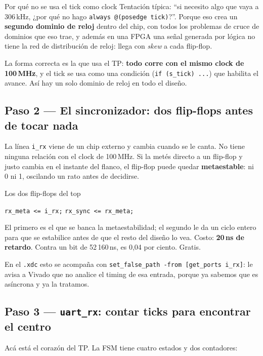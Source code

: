 \documentclass[11pt,a4paper]{article}
\newcommand{\sg}[1]{\texttt{\small #1}}
\begin{document}
\begin{intuicion}{Por qu\'e no se usa el tick como clock}
Tentaci\'on t\'ipica: ``si necesito algo que vaya a 306\,kHz, ¿por qu\'e no hago
\sg{always @(posedge tick)}?''. Porque eso crea un \textbf{segundo dominio de
reloj} dentro del chip, con todos los problemas de cruce de dominios que eso
trae, y adem\'as en una FPGA una se\~nal generada por l\'ogica no tiene la red de
distribuci\'on de reloj: llega con \emph{skew} a cada flip-flop.

La forma correcta es la que usa el TP: \textbf{todo corre con el mismo clock de
100\,MHz}, y el tick se usa como una condici\'on (\sg{if (s\_tick) ...}) que
habilita el avance. As\'i hay un solo dominio de reloj en todo el dise\~no.
\end{intuicion}

\subsection{Paso 2 --- El sincronizador: dos flip-flops antes de tocar nada}

La l\'inea \sg{i\_rx} viene de un chip externo y cambia cuando se le canta. No
tiene ninguna relaci\'on con el clock de 100\,MHz. Si la met\'es directo a un
flip-flop y justo cambia en el instante del flanco, el flip-flop puede quedar
\textbf{metaestable}: ni 0 ni 1, oscilando un rato antes de decidirse.

\begin{ficha}{Los dos flip-flops del top}
\begin{center}
\sg{rx\_meta <= i\_rx;} \qquad \sg{rx\_sync <= rx\_meta;}
\end{center}
El primero es el que se banca la metaestabilidad; el segundo le da un ciclo entero
para que se estabilice antes de que el resto del dise\~no lo vea. Costo:
\textbf{20\,ns de retardo}. Contra un bit de 52\,160\,ns, es 0,04 por ciento.
Gratis.

\smallskip
En el \sg{.xdc} esto se acompa\~na con \sg{set\_false\_path -from [get\_ports i\_rx]}:
le avisa a Vivado que no analice el timing de esa entrada, porque ya sabemos que
es as\'incrona y ya la tratamos.
\end{ficha}

\subsection{Paso 3 --- \texttt{uart\_rx}: contar ticks para encontrar el centro}

Ac\'a est\'a el coraz\'on del TP. La FSM tiene cuatro estados y dos contadores:
\end{document}
